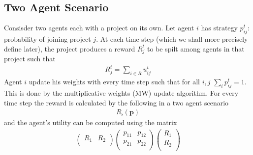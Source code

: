 \documentclass[a4paper,10pt]{article}
\theoremstyle{definition}
\begin{document}
\subsection{Two Agent Scenario}
Consisder two agents each with a project on its own. Let agent $i$ has strategy $p^t_{ij}$: probability of joining project $j$. At each time step (which we shall more precisely define later), the project produces a reward $R_j^t$ to be spilt among agents in that project such that
\begin{align*}
R_j^t=\sum_{i\in R}u_{ij}^t
\end{align*} 
Agent $i$ update his weights with every time step such that for all $i, j$ $\sum_ip_{ij}^t=1$. This is done by the multiplicative weights (MW) update algorithm. For every time step the reward is calculated by the following in a two agent scenario
\begin{align*}
R_{i}(\mathbf{p})
\end{align*}
and the agent's utility can be computed using the matrix
\begin{align*}
\begin{pmatrix}
R_{1} &R_{2}\\
\end{pmatrix}
\begin{pmatrix}
p_{11} & p_{12}\\
p_{21} & p_{22}\\
\end{pmatrix}
\begin{pmatrix}
R_{1}\\
R_{2}\\
\end{pmatrix}
\end{align*}


















































 

\end{document}
